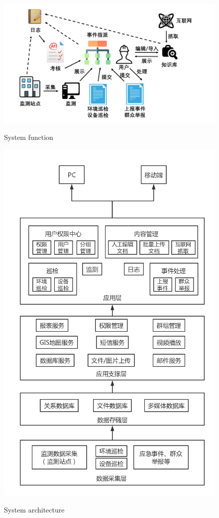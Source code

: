 \documentclass[]{IEEEtran}
\begin{document}
\begin{figure}[!hbt]
		\vspace{0.3cm}
		\begin{center}
			\includegraphics[width=0.9\columnwidth]{gt}
			\caption{System function}
			\label{fig:mp}
			\includegraphics[width=0.9\columnwidth]{pred}
			\caption{System architecture}
			\label{fig:ss}
		\end{center}
	\end{figure}

\end{document}
